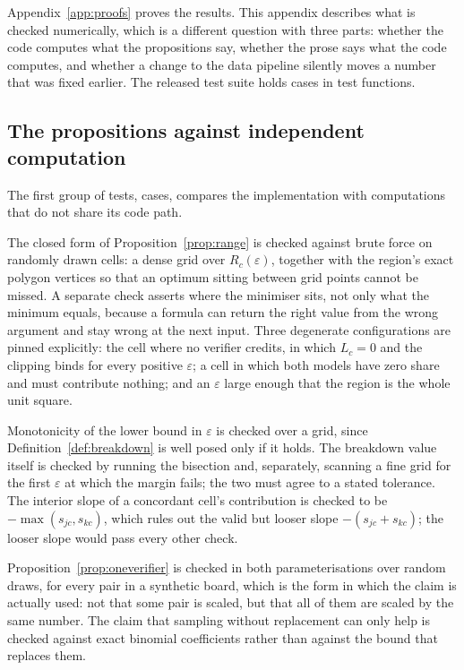 Appendix~\ref{app:proofs} proves the results. This appendix describes what is checked
numerically, which is a different question with three parts: whether the code computes what
the propositions say, whether the prose says what the code computes, and whether a change to
the data pipeline silently moves a number that was fixed earlier. The released test suite holds
\TestsTotal{} cases in \TestsFunctions{} test functions.

\subsection{The propositions against independent computation}

The first group of tests, \TestsCertification{} cases, compares the implementation with
computations that do not share its code path.

The closed form of Proposition~\ref{prop:range} is checked against brute force on randomly
drawn cells: a dense grid over $R_c(\varepsilon)$, together with the region's exact polygon
vertices so that an optimum sitting between grid points cannot be missed. A separate check
asserts where the minimiser sits, not only what the minimum equals, because a formula can
return the right value from the wrong argument and stay wrong at the next input. Three
degenerate configurations are pinned explicitly: the cell where no verifier credits, in which
$L_c = 0$ and the clipping binds for every positive $\varepsilon$; a cell in which both
models have zero share and must contribute nothing; and an $\varepsilon$ large enough that the
region is the whole unit square.

Monotonicity of the lower bound in $\varepsilon$ is checked over a grid, since
Definition~\ref{def:breakdown} is well posed only if it holds. The breakdown value itself is
checked by running the bisection and, separately, scanning a fine grid for the first
$\varepsilon$ at which the margin fails; the two must agree to a stated tolerance. The
interior slope of a concordant cell's contribution is checked to be
$-\max(s_{jc}, s_{kc})$, which rules out the valid but looser slope $-(s_{jc} + s_{kc})$; the
looser slope would pass every other check.

Proposition~\ref{prop:oneverifier} is checked in both parameterisations over random draws,
for every pair in a synthetic board, which is the form in which the claim is actually used:
not that some pair is scaled, but that all of them are scaled by the same number. The claim
that sampling without replacement can only help is checked against exact binomial coefficients
rather than against the bound that replaces them.

